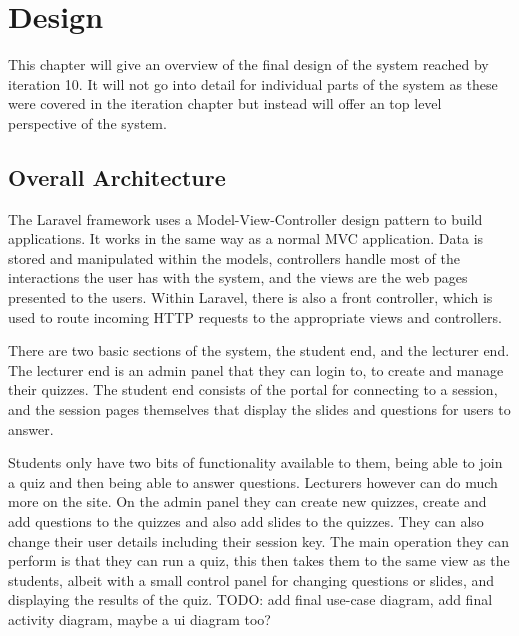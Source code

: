 \chapter{Design}
This chapter will give an overview of the final design of the system reached by iteration 10. It will not go into detail for individual parts of the system as these were covered in the iteration chapter but instead will offer an top level perspective of the system.

\section{Overall Architecture}
The Laravel framework uses a Model-View-Controller design pattern to build applications. It works in the same way as a normal MVC application. Data is stored and manipulated within the models, controllers handle most of the interactions the user has with the system, and the views are the web pages presented to the users. Within Laravel, there is also a front controller, which is used to route incoming HTTP requests to the appropriate views and controllers\cite{Laravel-architechture}.

There are two basic sections of the system, the student end, and the lecturer end. The lecturer end is an admin panel that they can login to, to create and manage their quizzes. The student end consists of the portal for connecting to a session, and the session pages themselves that display the slides and questions for users to answer.

Students only have two bits of functionality available to  them, being able to join a quiz and then being able to answer questions. Lecturers however can do much more on the site. On the admin panel they can create new quizzes, create and add questions to the quizzes and also add slides to the quizzes. They can also change their user details including their session key. The main operation they can perform is that they can run a quiz, this then takes them to the same view as the students, albeit with a small control panel for changing questions or slides, and displaying the results of the quiz. TODO: add final use-case diagram, add final activity diagram, maybe a ui diagram too?

